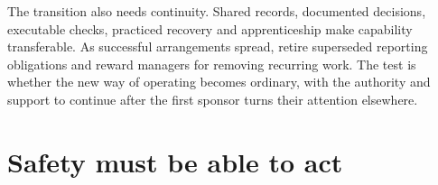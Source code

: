 \begin{EssayColumns}
The transition also needs continuity. Shared records, documented
decisions, executable checks, practiced recovery and apprenticeship make
capability transferable. As successful arrangements spread, retire
superseded reporting obligations and reward managers for removing
recurring work. The test is whether the new way of operating becomes
ordinary, with the authority and support to continue after the first
sponsor turns their attention elsewhere.

\end{EssayColumns}

\OutcomeFigure

\clearpage

\section{Safety must be able to act}\label{safety-must-be-able-to-act}

